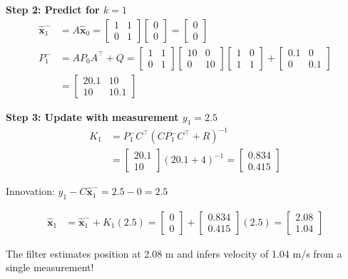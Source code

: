 \begin{examplebox}
\textbf{Step 2: Predict for $k=1$}
\begin{align}
\hat{\mathbf{x}}_1^- &= A\hat{\mathbf{x}}_0 = \begin{bmatrix} 1 & 1 \\ 0 & 1 \end{bmatrix}\begin{bmatrix} 0 \\ 0 \end{bmatrix} = \begin{bmatrix} 0 \\ 0 \end{bmatrix} \\
P_1^- &= AP_0A^\top + Q = \begin{bmatrix} 1 & 1 \\ 0 & 1 \end{bmatrix}\begin{bmatrix} 10 & 0 \\ 0 & 10 \end{bmatrix}\begin{bmatrix} 1 & 0 \\ 1 & 1 \end{bmatrix} + \begin{bmatrix} 0.1 & 0 \\ 0 & 0.1 \end{bmatrix} \\
&= \begin{bmatrix} 20.1 & 10 \\ 10 & 10.1 \end{bmatrix}
\end{align}

\textbf{Step 3: Update with measurement $y_1 = 2.5$}
\begin{align}
K_1 &= P_1^-C^\top(CP_1^-C^\top + R)^{-1} \\
&= \begin{bmatrix} 20.1 \\ 10 \end{bmatrix}(20.1 + 4)^{-1} = \begin{bmatrix} 0.834 \\ 0.415 \end{bmatrix}
\end{align}

Innovation: $y_1 - C\hat{\mathbf{x}}_1^- = 2.5 - 0 = 2.5$

\begin{align}
\hat{\mathbf{x}}_1 &= \hat{\mathbf{x}}_1^- + K_1(2.5) = \begin{bmatrix} 0 \\ 0 \end{bmatrix} + \begin{bmatrix} 0.834 \\ 0.415 \end{bmatrix}(2.5) = \begin{bmatrix} 2.08 \\ 1.04 \end{bmatrix}
\end{align}

The filter estimates position at 2.08 m and infers velocity of 1.04 m/s from a single measurement!
\end{examplebox}

